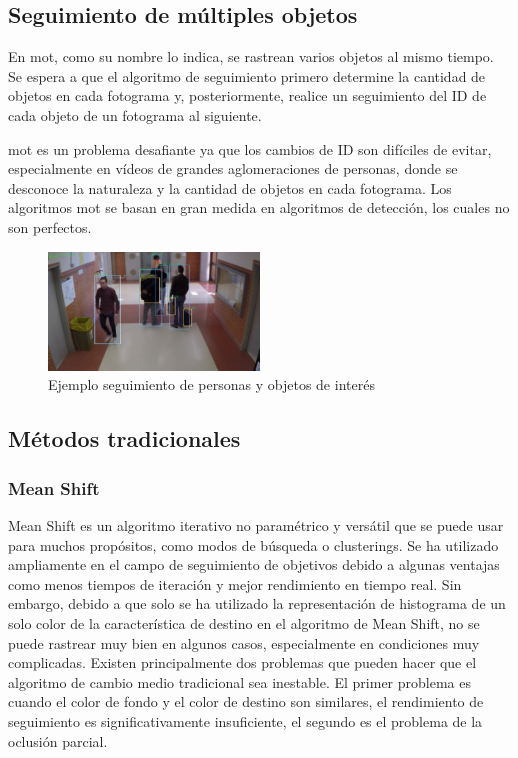 \subsection{Seguimiento de múltiples objetos}
\label{subsec:seguimiento-multiples-objeto}

En \gls{mot}, como su nombre lo indica, se rastrean varios objetos al mismo tiempo. Se espera a que el algoritmo de seguimiento primero determine la cantidad de objetos en cada fotograma y, posteriormente, realice un seguimiento del ID de cada objeto de un fotograma al siguiente.

\gls{mot} es un problema desafiante ya que los cambios de ID son difíciles de evitar, especialmente en vídeos de grandes aglomeraciones de personas, donde se desconoce la naturaleza y la cantidad de objetos en cada fotograma. Los algoritmos \gls{mot} se basan en gran medida en algoritmos de detección, los cuales no son perfectos.

\begin{figure}[ht]
\centering
\includegraphics[width=0.5\textwidth]{img/chapters/estado-del-arte/mot-gba.jpg}
\caption{\label{fig:mot-gba}Ejemplo seguimiento de personas y objetos de interés}
\end{figure}

\subsection{Métodos tradicionales}
\label{subsec:metodos-tradicionales-seguimiento}

\subsubsection*{Mean Shift}
\label{subsubsec:mean-shift}

Mean Shift es un algoritmo iterativo no paramétrico y versátil que se puede usar para muchos propósitos, como modos de búsqueda o clusterings. Se ha utilizado ampliamente en el campo de seguimiento de objetivos debido a algunas ventajas como menos tiempos de iteración y mejor rendimiento en tiempo real. Sin embargo, debido a que solo se ha utilizado la representación de histograma de un solo color de la característica de destino en el algoritmo de Mean Shift, no se puede rastrear muy bien en algunos casos, especialmente en condiciones muy complicadas. Existen principalmente dos problemas que pueden hacer que el algoritmo de cambio medio tradicional sea inestable. El primer problema es cuando el color de fondo y el color de destino son similares, el rendimiento de seguimiento es significativamente insuficiente, el segundo es el problema de la oclusión parcial.

